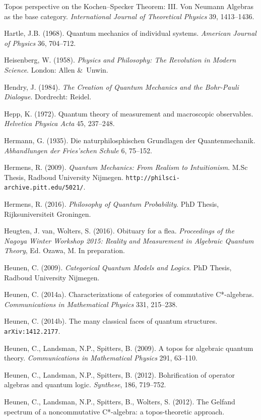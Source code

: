 \documentclass[12pt]{article}
\begin{document}
\begin{footnotesize}
\begin{trivlist}
Topos perspective on the Kochen--Specker Theorem: III. Von Neumann Algebras as the base category.
 \emph{International Journal of Theoretical Physics} 39, 1413--1436.
 \item
Hartle, J.B. (1968). Quantum mechanics of individual systems. \emph{American Journal of Physics} 36, 704--712.  
\item Heisenberg, W. (1958). \emph{Physics and Philosophy: The Revolution in Modern Science}. London: Allen \&\ Unwin.
 \item Hendry, J. (1984). \emph{The Creation of Quantum Mechanics and the Bohr-Pauli Dialogue}.  Dordrecht: Reidel.
  \item  Hepp, K.  (1972). Quantum theory of measurement and macroscopic observables.
  \emph{Helvetica Physica Acta}  45, 237--248.
\item Hermann, G. (1935). Die naturphilosphischen Grundlagen der Quantenmechanik.
 \emph{Abhandlungen der Fries'schen Schule} 6, 75--152. 
 \item 
Hermens, R. (2009). \emph{Quantum Mechanics: From Realism to Intuitionism}. M.Sc Thesis, Radboud University Nijmegen.
\texttt{http://philsci-archive.pitt.edu/5021/}.
 \item 
Hermens, R. (2016). \emph{Philosophy of Quantum Probability}. PhD Thesis, Rijksuniversiteit Groningen. 
 \item Heugten, J. van, Wolters, S. (2016). Obituary for a flea.
  \emph{Proceedings of the Nagoya Winter Workshop 2015: Reality and Measurement in Algebraic Quantum Theory}, Ed. Ozawa, M. In preparation.
\item  Heunen, C. (2009). \emph{Categorical Quantum Models and Logics}.   PhD Thesis, Radboud University Nijmegen.
\item  Heunen, C.  (2014a). Characterizations of categories of commutative C*-algebras. \emph{Communications in Mathematical
Physics} 331, 215--238. 
\item  Heunen, C.  (2014b). The many classical faces of quantum structures. \texttt{arXiv:1412.2177}.
\item  Heunen, C., Landsman, N.P., Spitters, B. (2009). 
A topos for algebraic quantum theory. \emph{Communications in Mathematical Physics} 291, 63--110.
\item  Heunen, C., Landsman, N.P., Spitters, B. (2012).
 Bohrification of operator algebras and quantum logic.  \emph{Synthese}, 186, 719--752.
  \item  Heunen, C., Landsman, N.P., Spitters, B., Wolters, S. (2012).
  The Gelfand spectrum of a noncommutative C*-algebra: a topos-theoretic approach.

\end{trivlist}
\end{footnotesize}
\end{document}
